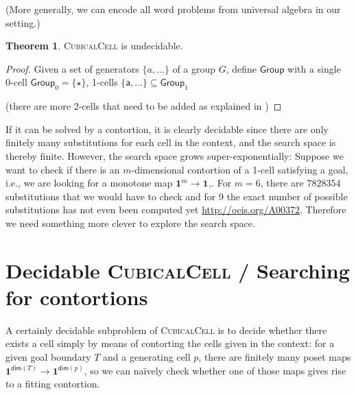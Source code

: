 \documentclass[11pt]{article}
\theoremstyle{definition}
\newtheorem{theorem}{Theorem}
\newcommand{\problem}[1]{\textsc{{#1}}}
\newcommand{\pint}[1]{\mathbf{1}^{#1}}
\renewcommand{\dim}[1]{\mathsf{dim}({#1})}
\newcommand{\smap}[1]{s_{{#1}}}
\newcommand{\dmap}[2]{d_{({#1} , {#2})}}
\newcommand{\cset}[1]{\mathsf{{#1}}}
\begin{document}
(More generally, we can encode all word problems from universal algebra in our setting.)

\begin{theorem}
  \problem{CubicalCell} is undecidable.
  \begin{proof}
    

    Given a set of generators $\{a, ...\}$ of a group $G$, define $\cset{Group}$
    with a single 0-cell $\cset{Group}_0 = \{ \cset{\star} \}$, 
    1-cells $\{\cset{a} , ... \} \subseteq \cset{Group}_1$ 
    
    (there are more 2-cells that need to be added as explained in \cite[Sect. 6.3]{bezem14_model_type_theor_cubic_sets})

\end{proof}
\end{theorem}

If it can be solved by a contortion, it is clearly decidable since there are
only finitely many substitutions for each cell in the context, and the search
space is thereby finite. However, the search space grows super-exponentially:
Suppose we want to check if there is an $m$-dimensional contortion of a 1-cell
satisfying a goal, i.e., we are looking for a monotone map $\pint{m} \to
\pint{}$,. For $m = 6$, there are $7828354$ substitutions that we would have to
check and for 9 the exact number of possible substitutions has not even been
computed yet \url{http://oeis.org/A00372}. Therefore we need something more
clever to explore the search space.



\section{Decidable \problem{CubicalCell} / Searching for contortions}

A certainly decidable subproblem of \problem{CubicalCell} is to decide whether
there exists a cell simply by means of contorting the cells given in the
context: for a given goal boundary $T$ and a generating cell $p$, there are
finitely many poset maps $\pint{\dim{T}} \to \pint{\dim{p}}$, so we can
na\"ively check whether one of those maps gives rise to a fitting contortion. 
\end{document}
